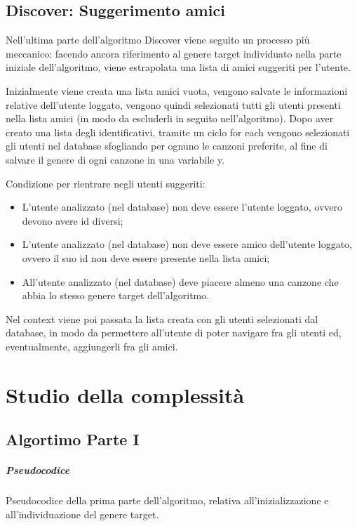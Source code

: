  
\newpage
\subsection{Discover: Suggerimento amici}
Nell'ultima parte dell'algoritmo Discover viene seguito un processo più meccanico: facendo ancora riferimento al genere target 
individuato nella parte iniziale dell'algoritmo, viene estrapolata una lista di amici suggeriti per l'utente. 

Inizialmente viene creata una lista amici vuota, vengono salvate le informazioni relative dell'utente loggato, vengono quindi 
selezionati tutti gli utenti presenti nella lista amici (in modo da escluderli in seguito nell'algoritmo).
Dopo aver creato una lista degli identificativi, tramite un ciclo for each vengono selezionati gli utenti nel database 
sfogliando per ognuno le canzoni preferite, al fine di salvare il genere di ogni canzone in una variabile y.

Condizione per rientrare negli utenti suggeriti:
\begin{itemize}
    \item L'utente analizzato (nel database) non deve essere l'utente loggato, ovvero devono avere id diversi;
    \item L'utente analizzato (nel database) non deve essere amico dell'utente loggato, ovvero il suo id non deve essere presente 
    nella lista amici;
    \item All'utente analizzato (nel database) deve piacere almeno una canzone che abbia lo stesso genere target dell'algoritmo.

\end{itemize}

Nel context viene poi passata la lista creata con gli utenti selezionati dal database, in modo da permettere all'utente di poter
navigare fra gli utenti ed, eventualmente, aggiungerli fra gli amici. 




\newpage

\section{Studio della complessità}

\subsection{Algortimo Parte I}
\vspace{0.5cm}
\subparagraph{Pseudocodice}
Pseudocodice della prima parte dell'algoritmo, relativa all'inizializzazione 
e all'individuazione del genere target. 

